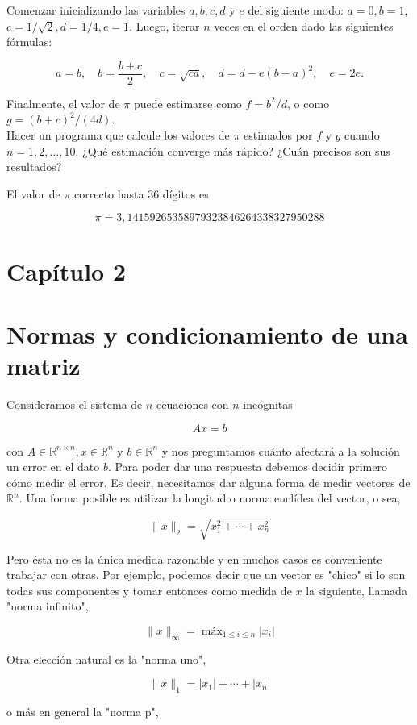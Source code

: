 \documentclass[10pt]{article}
\begin{document}
Comenzar inicializando las variables $a, b, c, d$ y $e$ del siguiente modo: $a=0, b=1$, $c=1 / \sqrt{2}, d=1 / 4, e=1$. Luego, iterar $n$ veces en el orden dado las siguientes fórmulas:

$$
a=b, \quad b=\frac{b+c}{2}, \quad c=\sqrt{c a}, \quad d=d-e(b-a)^{2}, \quad e=2 e .
$$

Finalmente, el valor de $\pi$ puede estimarse como $f=b^{2} / d$, o como $g=(b+c)^{2} /(4 d)$.\\
Hacer un programa que calcule los valores de $\pi$ estimados por $f$ y $g$ cuando $n= 1,2, \ldots, 10$. ¿Qué estimación converge más rápido? ¿Cuán precisos son sus resultados?

El valor de $\pi$ correcto hasta 36 dígitos es

$$
\pi=3,14159265358979323846264338327950288
$$

\section*{Capítulo 2}
\section*{Normas y condicionamiento de una matriz}
Consideramos el sistema de $n$ ecuaciones con $n$ incógnitas

$$
A x=b
$$

con $A \in \mathbb{R}^{n \times n}, x \in \mathbb{R}^{n}$ y $b \in \mathbb{R}^{n}$ y nos preguntamos cuánto afectará a la solución un error en el dato $b$. Para poder dar una respuesta debemos decidir primero cómo medir el error. Es decir, necesitamos dar alguna forma de medir vectores de $\mathbb{R}^{n}$. Una forma posible es utilizar la longitud o norma euclídea del vector, o sea,

$$
\|x\|_{2}=\sqrt{x_{1}^{2}+\cdots+x_{n}^{2}}
$$

Pero ésta no es la única medida razonable y en muchos casos es conveniente trabajar con otras. Por ejemplo, podemos decir que un vector es "chico" si lo son todas sus componentes y tomar entonces como medida de $x$ la siguiente, llamada "norma infinito",

$$
\|x\|_{\infty}=\operatorname{máx}_{1 \leq i \leq n}\left|x_{i}\right|
$$

Otra elección natural es la "norma uno",

$$
\|x\|_{1}=\left|x_{1}\right|+\cdots+\left|x_{n}\right|
$$

o más en general la "norma p",
\end{document}
